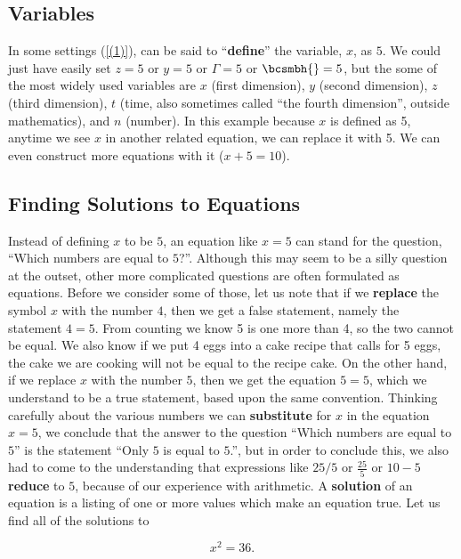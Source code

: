 \documentclass{book}
\theoremstyle{definition}
\begin{document}
\subsection{Variables}

In some settings (\ref{(1)}), can be said to ``{\bf define}'' the variable, $x$, as $5$.   We could just have easily set $z=5$ or $y=5$ or $\Gamma=5$ or $\bcsmbh{}=5$, but the some of the most widely used variables are $x$ (first dimension), $y$ (second dimension), $z$ (third dimension), $t$ (time, also sometimes called ``the fourth dimension'', outside mathematics), and $n$ (number). In this example because $x$ is defined as 5, anytime we see $x$ in another related equation, we can replace it with 5. We can even construct more equations with it ($x+5=10$).

\subsection{Finding Solutions to Equations}

Instead of defining $x$ to be $5$, an equation like $x=5$ can stand for the question, ``Which numbers are equal to $5$?''.  Although this may seem to be a silly question at the outset, other more complicated questions are often formulated as equations.  Before we consider some of those, let us note that if we {\bf replace} the symbol $x$ with the number $4$, then we get a false statement, namely the statement $4=5$. From counting we know 5 is one more than 4, so the two cannot be equal. We also know if we put 4 eggs into a cake recipe that calls for 5 eggs, the cake we are cooking will not be equal to the recipe cake. On the other hand, if we replace $x$ with the number $5$, then we get the equation $5=5$, which we understand to be a true statement, based upon the same convention.  Thinking carefully about the various numbers we can {\bf substitute} for $x$ in the equation $x=5$, we conclude that the answer to the question ``Which numbers are equal to $5$'' is the statement ``Only $5$ is equal to $5$.'', but in order to conclude this, we also had to come to the understanding that expressions like $25/5$ or $\frac{25}5$ or $10-5$ {\bf reduce} to $5$, because of our experience with arithmetic.  
A {\bf solution} of an equation is a listing of one or more values which make an equation true. Let us find all of the solutions to

\begin{equation}\label{(2)}
x^2=36.                
\end{equation}
\end{document}

